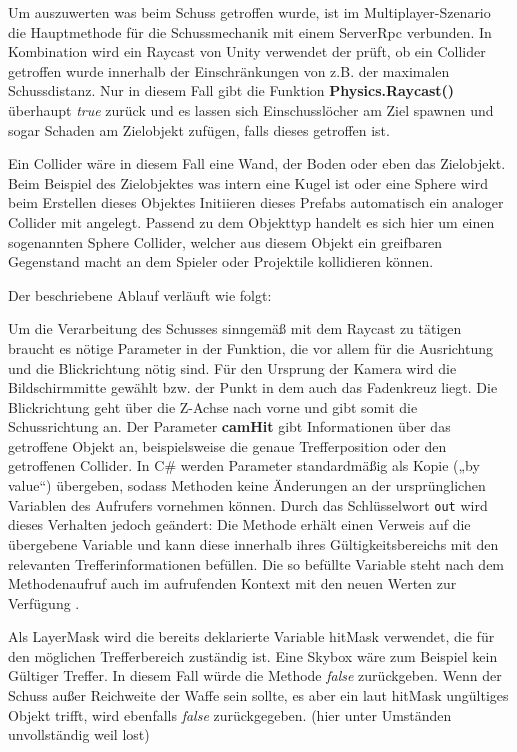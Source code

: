 Um auszuwerten was beim Schuss getroffen wurde, ist im Multiplayer-Szenario die Hauptmethode für die Schussmechanik mit einem ServerRpc verbunden. In Kombination wird ein Raycast von Unity verwendet der prüft, ob ein Collider getroffen wurde innerhalb der Einschränkungen von z.B. der maximalen Schussdistanz.
Nur in diesem Fall gibt die Funktion \textbf{Physics.Raycast()} überhaupt \textit{true} zurück und es lassen sich Einschusslöcher am Ziel spawnen und sogar Schaden am Zielobjekt zufügen, falls dieses getroffen ist.

Ein Collider wäre in diesem Fall eine Wand, der Boden oder eben das Zielobjekt. Beim Beispiel des Zielobjektes was intern eine Kugel ist oder eine Sphere wird beim Erstellen dieses Objektes Initiieren dieses Prefabs automatisch ein analoger Collider mit angelegt. 
Passend zu dem Objekttyp handelt es sich hier um einen sogenannten Sphere Collider, welcher aus diesem Objekt ein greifbaren Gegenstand macht an dem Spieler oder Projektile kollidieren können.

\newpage

Der beschriebene Ablauf verläuft wie folgt:


Um die Verarbeitung des Schusses sinngemäß mit dem Raycast zu tätigen braucht es nötige Parameter in der Funktion, die vor allem für die Ausrichtung und die Blickrichtung nötig sind.
Für den Ursprung der Kamera wird die Bildschirmmitte gewählt bzw. der Punkt in dem auch das Fadenkreuz liegt. 
Die Blickrichtung geht über die Z-Achse nach vorne und gibt somit die Schussrichtung an. 
Der Parameter \textbf{camHit} gibt Informationen über das getroffene Objekt an, beispielsweise die genaue Trefferposition oder den getroffenen Collider. In C\# werden Parameter standardmäßig als Kopie („by value“) übergeben, sodass Methoden keine Änderungen an der ursprünglichen Variablen des Aufrufers vornehmen können. Durch das Schlüsselwort \texttt{out} wird dieses Verhalten jedoch geändert: Die Methode erhält einen Verweis auf die übergebene Variable und kann diese innerhalb ihres Gültigkeitsbereichs mit den relevanten Trefferinformationen befüllen. Die so befüllte Variable steht nach dem Methodenaufruf auch im aufrufenden Kontext mit den neuen Werten zur Verfügung \cite{dotnetOut}.

Als LayerMask wird die bereits deklarierte Variable hitMask verwendet, die für den möglichen Trefferbereich zuständig ist. Eine Skybox wäre zum Beispiel kein Gültiger Treffer. In diesem Fall würde die Methode \textit{false} zurückgeben.
Wenn der Schuss außer Reichweite der Waffe sein sollte, es aber ein laut hitMask ungültiges Objekt trifft, wird ebenfalls \textit{false} zurückgegeben. 
(hier unter Umständen unvollständig weil lost)

